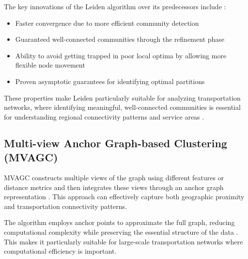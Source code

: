 The key innovations of the Leiden algorithm over its predecessors include \cite{traag2019louvain}:
\begin{itemize}
    \item Faster convergence due to more efficient community detection
    \item Guaranteed well-connected communities through the refinement phase
    \item Ability to avoid getting trapped in poor local optima by allowing more flexible node movement
    \item Proven asymptotic guarantees for identifying optimal partitions
\end{itemize}

These properties make Leiden particularly suitable for analyzing transportation networks, where identifying meaningful, well-connected communities is essential for understanding regional connectivity patterns and service areas \cite{newman2010networks, fortunato2010community}.

\subsection{Multi-view Anchor Graph-based Clustering (MVAGC)}
\label{subsec:MVAGC}

MVAGC constructs multiple views of the graph using different features or distance metrics and then integrates these views through an anchor graph representation \cite{liu2010large}. This approach can effectively capture both geographic proximity and transportation connectivity patterns.

The algorithm employs anchor points to approximate the full graph, reducing computational complexity while preserving the essential structure of the data \cite{liu2010large, nie2011spectral}. This makes it particularly suitable for large-scale transportation networks where computational efficiency is important.

